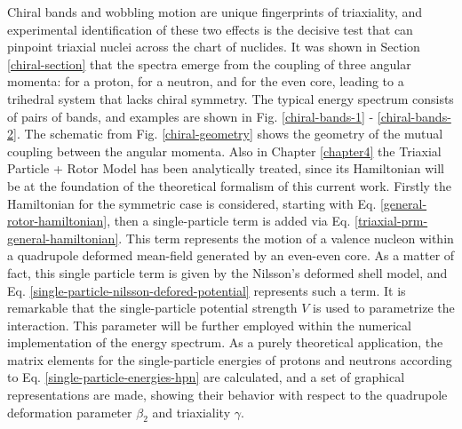 Chiral bands and wobbling motion are unique fingerprints of triaxiality, and experimental identification of these two effects is the decisive test that can pinpoint triaxial nuclei across the chart of nuclides. It was shown in Section \ref{chiral-section} that the spectra emerge from the coupling of three angular momenta: for a proton, for a neutron, and for the even core, leading to a trihedral system that lacks chiral symmetry. The typical energy spectrum consists of pairs of bands, and examples are shown in Fig. \ref{chiral-bands-1} - \ref{chiral-bands-2}. The schematic from Fig. \ref{chiral-geometry} shows the geometry of the mutual coupling between the angular momenta. Also in Chapter \ref{chapter4} the Triaxial Particle + Rotor Model has been analytically treated, since its Hamiltonian will be at the foundation of the theoretical formalism of this current work. Firstly the Hamiltonian for the symmetric case is considered, starting with Eq. \ref{general-rotor-hamiltonian}, then a single-particle term is added via Eq. \ref{triaxial-prm-general-hamiltonian}. This term represents the motion of a valence nucleon within a quadrupole deformed mean-field generated by an even-even core. As a matter of fact, this single particle term is given by the Nilsson's deformed shell model, and Eq. \ref{single-particle-nilsson-defored-potential} represents such a term. It is remarkable that the single-particle potential strength $V$ is used to parametrize the interaction. This parameter will be further employed within the numerical implementation of the energy spectrum. As a purely theoretical application, the matrix elements for the single-particle energies of protons and neutrons according to Eq. \ref{single-particle-energies-hpn} are calculated, and a set of graphical representations are made, showing their behavior with respect to the quadrupole deformation parameter $\beta_2$ and triaxiality $\gamma$. 

